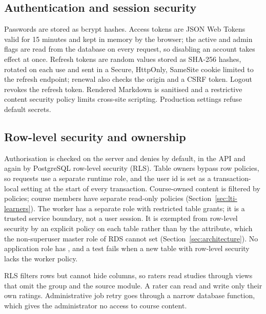 \subsection{Authentication and session security}
Passwords are stored as bcrypt hashes\citep{bcrypt}. Access tokens are JSON Web Tokens\citep{jwt} valid for 15 minutes and kept in memory by the browser; the active and admin flags are read from the database on every request, so disabling an account takes effect at once. Refresh tokens are random values stored as SHA-256 hashes, rotated on each use and sent in a Secure, HttpOnly, SameSite cookie limited to the refresh endpoint; renewal also checks the origin and a CSRF token. Logout revokes the refresh token. Rendered Markdown is sanitised and a restrictive content security policy limits cross-site scripting. Production settings refuse default secrets.
\subsection{Row-level security and ownership}
Authorisation is checked on the server and denies by default\citep{owaspaccess}, in the API and again by PostgreSQL row-level security (RLS). Table owners bypass row policies\citep{postgresrls}, so requests use a separate runtime role, and the user id is set as a transaction-local setting at the start of every transaction. Course-owned content is filtered by policies; course members have separate read-only policies (Section~\ref{sec:lti-learners}). The worker has a separate role with restricted table grants; it is a trusted service boundary, not a user session. It is exempted from row-level security by an explicit policy on each table rather than by the  attribute, which the non-superuser master role of RDS cannot set (Section~\ref{sec:architecture}). No application role has , and a test fails when a new table with row-level security lacks the worker policy.

RLS filters rows but cannot hide columns, so raters read studies through views that omit the group and the source module. A rater can read and write only their own ratings. Administrative job retry goes through a narrow database function, which gives the administrator no access to course content.
